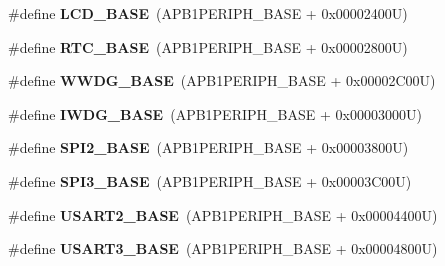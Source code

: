 \begin{DoxyCompactItemize}
\item 
\hypertarget{group___peripheral__memory__map_ga017749aad23300240ef5ac4c3d5ca750}{\#define {\bfseries L\-C\-D\-\_\-\-B\-A\-S\-E}~(A\-P\-B1\-P\-E\-R\-I\-P\-H\-\_\-\-B\-A\-S\-E + 0x00002400\-U)}\label{group___peripheral__memory__map_ga017749aad23300240ef5ac4c3d5ca750}

\item 
\hypertarget{group___peripheral__memory__map_ga4265e665d56225412e57a61d87417022}{\#define {\bfseries R\-T\-C\-\_\-\-B\-A\-S\-E}~(A\-P\-B1\-P\-E\-R\-I\-P\-H\-\_\-\-B\-A\-S\-E + 0x00002800\-U)}\label{group___peripheral__memory__map_ga4265e665d56225412e57a61d87417022}

\item 
\hypertarget{group___peripheral__memory__map_ga9a5bf4728ab93dea5b569f5b972cbe62}{\#define {\bfseries W\-W\-D\-G\-\_\-\-B\-A\-S\-E}~(A\-P\-B1\-P\-E\-R\-I\-P\-H\-\_\-\-B\-A\-S\-E + 0x00002\-C00\-U)}\label{group___peripheral__memory__map_ga9a5bf4728ab93dea5b569f5b972cbe62}

\item 
\hypertarget{group___peripheral__memory__map_ga8543ee4997296af5536b007cd4748f55}{\#define {\bfseries I\-W\-D\-G\-\_\-\-B\-A\-S\-E}~(A\-P\-B1\-P\-E\-R\-I\-P\-H\-\_\-\-B\-A\-S\-E + 0x00003000\-U)}\label{group___peripheral__memory__map_ga8543ee4997296af5536b007cd4748f55}

\item 
\hypertarget{group___peripheral__memory__map_gac3e357b4c25106ed375fb1affab6bb86}{\#define {\bfseries S\-P\-I2\-\_\-\-B\-A\-S\-E}~(A\-P\-B1\-P\-E\-R\-I\-P\-H\-\_\-\-B\-A\-S\-E + 0x00003800\-U)}\label{group___peripheral__memory__map_gac3e357b4c25106ed375fb1affab6bb86}

\item 
\hypertarget{group___peripheral__memory__map_gae634fe8faa6922690e90fbec2fc86162}{\#define {\bfseries S\-P\-I3\-\_\-\-B\-A\-S\-E}~(A\-P\-B1\-P\-E\-R\-I\-P\-H\-\_\-\-B\-A\-S\-E + 0x00003\-C00\-U)}\label{group___peripheral__memory__map_gae634fe8faa6922690e90fbec2fc86162}

\item 
\hypertarget{group___peripheral__memory__map_gade83162a04bca0b15b39018a8e8ec090}{\#define {\bfseries U\-S\-A\-R\-T2\-\_\-\-B\-A\-S\-E}~(A\-P\-B1\-P\-E\-R\-I\-P\-H\-\_\-\-B\-A\-S\-E + 0x00004400\-U)}\label{group___peripheral__memory__map_gade83162a04bca0b15b39018a8e8ec090}

\item 
\hypertarget{group___peripheral__memory__map_gabe0d6539ac0026d598274ee7f45b0251}{\#define {\bfseries U\-S\-A\-R\-T3\-\_\-\-B\-A\-S\-E}~(A\-P\-B1\-P\-E\-R\-I\-P\-H\-\_\-\-B\-A\-S\-E + 0x00004800\-U)}\label{group___peripheral__memory__map_gabe0d6539ac0026d598274ee7f45b0251}


\end{DoxyCompactItemize}
